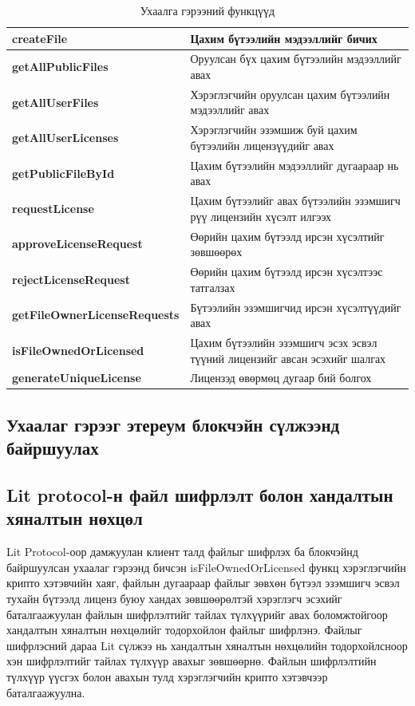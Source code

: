 \begin{table}[h!]
	\centering
   \begin{tabularx}{\textwidth}{|p{}|X|}
		\hline
		 \textbf{createFile}& Цахим бүтээлийн мэдээллийг бичих
	\\ \hline \textbf{getAllPublicFiles} & Оруулсан бүх цахим бүтээлийн мэдээллийг авах
	\\ \hline \textbf{getAllUserFiles} &  Хэрэглэгчийн оруулсан цахим бүтээлийн мэдээллийг авах
	\\ \hline \textbf{getAllUserLicenses} & Хэрэглэгчийн эзэмшиж буй цахим бүтээлийн лицензүүдийг авах
	\\ \hline \textbf{getPublicFileById} & Цахим бүтээлийн мэдээллийг дугаараар нь авах
	\\ \hline \textbf{requestLicense} & Цахим бүтээлийг авах бүтээлийн эзэмшигч рүү лицензийн хүсэлт илгээх
	\\ \hline \textbf{approveLicenseRequest} & Өөрийн цахим бүтээлд ирсэн хүсэлтийг зөвшөөрөх
	\\ \hline \textbf{rejectLicenseRequest} & Өөрийн цахим бүтээлд ирсэн хүсэлтээс татгалзах
	\\ \hline \textbf{getFileOwnerLicenseRequests} & Бүтээлийн эзэмшигчид ирсэн хүсэлтүүдийг авах
	\\ \hline \textbf{isFileOwnedOrLicensed} & Цахим бүтээлийн эзэмшигч эсэх эсвэл түүний лицензийг авсан эсэхийг шалгах
	\\ \hline \textbf{generateUniqueLicense} & Лицензэд өвөрмөц дугаар бий болгох                                                             \\ \hline
	\end{tabularx}
   \caption{Ухаалга гэрээний функцүүд}
\end{table}

\newpage
\subsection{Ухаалаг гэрээг этереум блокчэйн сүлжээнд байршуулах}


\subsection{Lit protocol-н файл шифрлэлт болон хандалтын хяналтын нөхцөл}
Lit Protocol-оор дамжуулан клиент талд файлыг шифрлэх ба блокчэйнд байршуулсан ухаалаг гэрээнд бичсэн isFileOwnedOrLicensed функц хэрэглэгчийн крипто хэтэвчийн хаяг, файлын дугаараар файлыг зөвхөн бүтээл эзэмшигч эсвэл тухайн бүтээлд лиценз буюу хандах зөвшөөрөлтэй хэрэглэгч эсэхийг баталгаажуулан файлын шифрлэлтийг тайлах түлхүүрийг авах боломжтойгоор хандалтын хяналтын нөхцөлийг тодорхойлон файлыг шифрлэнэ. Файлыг шифрлэсний дараа Lit сүлжээ нь хандалтын хяналтын нөхцөлийн тодорхойлсноор хэн шифрлэлтийг тайлах түлхүүр авахыг зөвшөөрнө.
Файлын шифрлэлтийн түлхүүр үүсгэх болон авахын тулд хэрэглэгчийн крипто хэтэвчээр баталгаажуулна.

